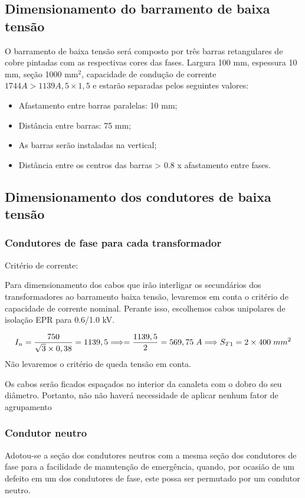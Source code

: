 \subsection{Dimensionamento do barramento de baixa tensão}
O barramento de baixa tensão será composto por três barras retangulares de cobre pintadas com
as respectivas cores das fases. Largura 100 mm, espessura 10 mm, seção 1000 mm$^2$, capacidade de condução de corrente $1744A > 1139A,5\times1,5$ e estarão separadas
pelos seguintes valores:
\begin{itemize}
\item Afastamento entre barras paralelas: 10 mm;
\item Distância entre barras: 75 mm;
\item As barras serão instaladas na vertical;
\item Distância entre os centros das barras > 0.8 x afastamento entre fases.
\end{itemize}

\subsection{Dimensionamento dos condutores de baixa tensão}
\subsubsection{Condutores de fase para cada transformador}
Critério de corrente:

Para dimensionamento dos cabos que irão interligar os secundários dos transformadores ao
barramento baixa tensão, levaremos em conta o critério de capacidade de corrente nominal. Perante isso, escolhemos cabos unipolares de isolação EPR para 0.6/1.0 kV.

\begin{equation*}
{I}_{n}=\frac{750}{\sqrt{3}\times 0,38}=1139,5 \Longrightarrow = \frac{1139,5}{2}=569,75 \hspace{0.1cm}A \Longrightarrow {S}_{T1}= 2 \times 400 \hspace{0.1cm}mm^2
\end{equation*}
Não levaremos o critério de queda tensão em conta.

Os cabos serão ficados espaçados no interior da canaleta com o dobro do seu diâmetro. Portanto, não não haverá necessidade de aplicar nenhum fator de agrupamento
\subsubsection{Condutor neutro}
Adotou-se a seção dos condutores neutros com a mesma seção dos condutores de fase para a facilidade de manutenção de emergência, quando, por ocasião de um defeito em um dos condutores de fase, este possa ser permutado por um condutor neutro.
